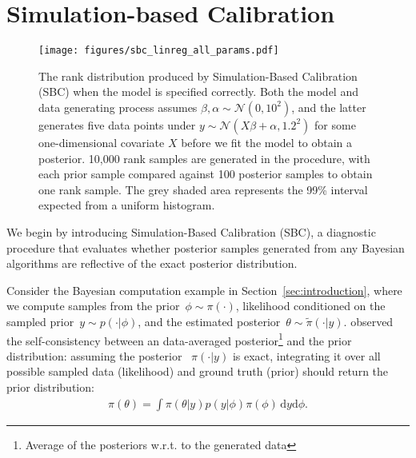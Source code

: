 \documentclass[twoside]{article}
\begin{document}
\section{Simulation-based Calibration}
\label{sec:sbc}

\begin{figure*}
\vspace*{0pt}
\begin{center}
  \texttt{[image: figures/sbc\_linreg\_all\_params.pdf]}
\end{center}
\vspace*{-12pt}
\caption{The rank distribution produced by  Simulation-Based Calibration (SBC) when the model is specified correctly. Both the model and data generating process assumes $\beta, \alpha \sim \mathcal{N}(0, 10^2)$, and the latter generates five data points under $y \sim \mathcal{N}(X\beta + \alpha, 1.2^2)$ for some one-dimensional covariate $X$ before we fit the model to obtain a posterior. 10,000 rank samples are generated in the procedure, with each prior sample compared against 100 posterior samples to obtain one rank sample. The grey shaded area represents the 99\% interval expected from a uniform histogram.}
\label{fig:sbc_linreg_all_params}
\end{figure*}

We begin by introducing Simulation-Based Calibration (SBC), a diagnostic procedure that evaluates whether posterior samples generated from any Bayesian algorithms are reflective of the exact posterior distribution.

Consider the Bayesian computation example in Section~\ref{sec:introduction}, where we compute samples from the prior~$\phi \sim \pi(\cdot)$, likelihood conditioned on the sampled prior~${y \sim p(\cdot | \phi)}$, and the estimated posterior~${\theta \sim \tilde{\pi}( \cdot | y)}$. \citep{cook2006validation} observed the self-consistency between an data-averaged posterior\footnote{Average of the posteriors w.r.t. to the generated data} and the prior distribution: assuming the posterior ~$\pi(\cdot|y)$ is exact, integrating it over all possible sampled data (likelihood) and ground truth (prior) should return the prior distribution:
\begin{align}
    \pi(\theta) = \int \pi(\theta|y) p(y|\phi) \pi(\phi) \,\textrm{d}y \textrm{d}\phi .
    \label{eq:self_consistency}
\end{align}
\end{document}
